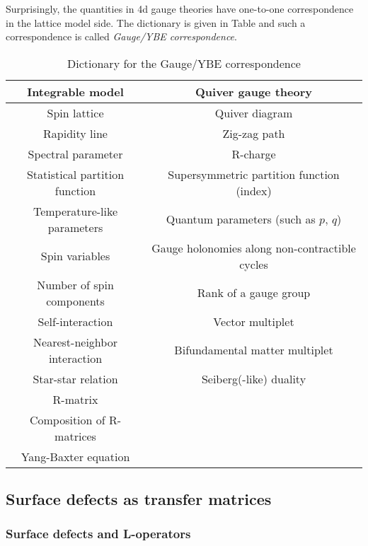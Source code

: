 Surprisingly, the quantities in 4d gauge theories have one-to-one
correspondence in the lattice model side. The dictionary is given
in Table and such a correspondence is called \emph{Gauge/YBE correspondence}.
\begin{table}
\caption{Dictionary for the Gauge/YBE correspondence}
\vspace{0.2cm}
  \centering
    \begin{tabular}{c|c}
Integrable model & Quiver gauge theory  \tabularnewline
\hline 
\hline 
Spin lattice            & Quiver diagram  \tabularnewline
Rapidity line          & Zig-zag path  \tabularnewline
Spectral parameter & R-charge  \tabularnewline
Statistical partition function    & Supersymmetric partition function (index)  \tabularnewline
Temperature-like parameters & Quantum parameters (such as $p,\,q$)  \tabularnewline
Spin variables       & Gauge holonomies along non-contractible cycles  \tabularnewline
Number of spin components  & Rank of a gauge group  \tabularnewline
Self-interaction    & Vector multiplet  \tabularnewline
Nearest-neighbor interaction & Bifundamental matter multiplet  \tabularnewline
Star-star relation  & Seiberg(-like) duality  \tabularnewline
R-matrix                  &                        \tabularnewline
Composition of R-matrices     &      \tabularnewline
Yang-Baxter equation &                \tabularnewline
    \end{tabular}
\end{table}



\subsection{Surface defects as transfer matrices}

\subsubsection{Surface defects and L-operators}


